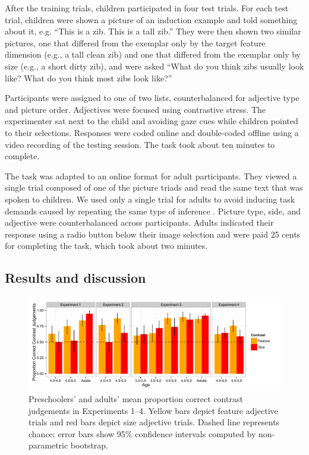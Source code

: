 \documentclass[man]{apa2}
\begin{document}
After the training trials, children participated in four test trials.  For each test trial, children were shown a picture of an induction example and told something about it, e.g. ``This is a zib. This is a tall zib.''  They were then shown two similar pictures, one that differed from the exemplar only by the target feature dimension (e.g., a tall clean zib) and one that differed from the exemplar only by size (e.g., a short dirty zib), and were asked ``What do you think zibs usually look like?  What do you think most zibs look like?'' 

Participants were assigned to one of two lists, counterbalanced for adjective type and picture order.  Adjectives were focused using contrastive stress. The experimenter sat next to the child and avoiding gaze cues while children pointed to their selections.  Responses were coded online and double-coded offline using a video recording of the testing session.  The task took about ten minutes to complete. 

The task was adapted to an online format for adult participants. They viewed a single trial composed of one of the picture triads and read the same text that was spoken to children. We used only a single trial for adults to avoid inducing task demands caused by repeating the same type of inference \cite{frank2012}. Picture type, side, and adjective were counterbalanced across participants.  Adults indicated their response using a radio button below their image selection and were paid 25 cents for completing the task, which took about two minutes. 



\subsection{Results and discussion}

\begin{figure}[t] 
  \begin{center} 
    \includegraphics[width=6.5in]{figures/experimentsReorder.pdf} 
    \caption{\label{fig:experiments1thru4} Preschoolers' and adults' mean proportion correct contrast judgements in Experiments 1--4.     
  Yellow bars depict feature adjective trials and red bars depict size adjective trials. Dashed line represents chance; error bars show 95\% confidence intervals computed by non-parametric bootstrap.}
  \end{center} 
  \vspace{-10ex} 
\end{figure}
\end{document}
